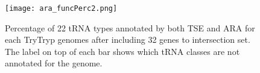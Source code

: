 \documentclass[
10pt, %
a4paper, %
oneside, %
headinclude,footinclude, %
BCOR5mm, %
]{scrartcl}
\begin{document}
\begin{figure}[tb]
\centering 
\texttt{[image: ara\_funcPerc2.png]} 
\caption[Genome Comparison]{Percentage of 22 tRNA types annotated by both TSE and ARA for each TryTryp genomes after including 32 genes to intersection set. The label on top of each bar shows which tRNA classes are not annotated for the genome.} %
\label{fig:typesimproved} 
\end{figure}
\newpage
\renewcommand{\refname}{\spacedlowsmallcaps{References}} %




\end{document}

